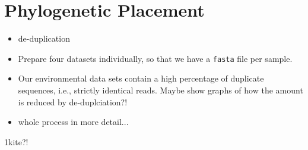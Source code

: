 
\section{Phylogenetic Placement}
\label{sec:PhylogeneticPlacement}

\begin{itemize}
    \item de-duplication
    \item Prepare four datasets individually, so that we have a \texttt{fasta} file per sample.
    \item Our environmental data sets contain a high percentage of duplicate sequences, i.e., strictly identical reads.
    Maybe show graphs of how the amount is reduced by de-duplciation?!
    \item whole process in more detail...
\end{itemize}


1kite?!

